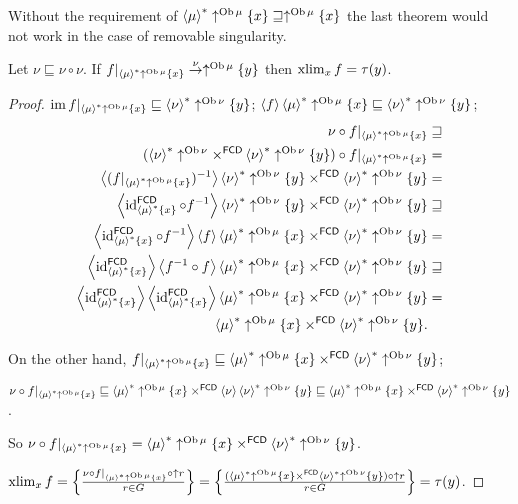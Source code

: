 \begin{rem}
Without the requirement of $\rsupfun{\mu}\uparrow^{\Ob\mu}\{x\}\sqsupseteq\uparrow^{\Ob\mu}\{x\}$
the last theorem would not work in the case of removable singularity.\end{rem}
\begin{thm}
Let $\nu\sqsubseteq\nu\circ\nu$. If $f|_{\rsupfun{\mu}\uparrow^{\Ob\mu}\{x\}}\overset{\nu}{\rightarrow}\uparrow^{\Ob\mu}\{y\}$
then $\xlim_{x}f=\tau(y)$.\end{thm}
\begin{proof}
$\im f|_{\rsupfun{\mu}\uparrow^{\Ob\mu}\{x\}}\sqsubseteq\rsupfun{\nu}\uparrow^{\Ob\nu}\{y\}$;
$\supfun f\rsupfun{\mu}\uparrow^{\Ob\mu}\{x\}\sqsubseteq\rsupfun{\nu}\uparrow^{\Ob\nu}\{y\}$;
\begin{align*}
\nu\circ f|_{\rsupfun{\mu}\uparrow^{\Ob\mu}\{x\}} & \sqsupseteq\\
(\rsupfun{\nu}\uparrow^{\Ob\nu}\times^{\mathsf{FCD}}\rsupfun{\nu}\uparrow^{\Ob\nu}\{y\})\circ f|_{\rsupfun{\mu}\uparrow^{\Ob\mu}\{x\}} & =\\
\supfun{(f|_{\rsupfun{\mu}\uparrow^{\Ob\mu}\{x\}})^{-1}}\rsupfun{\nu}\uparrow^{\Ob\nu}\{y\}\times^{\mathsf{FCD}}\rsupfun{\nu}\uparrow^{\Ob\nu}\{y\} & =\\
\supfun{\id_{\rsupfun{\mu}\{x\}}^{\mathsf{FCD}}\circ f^{-1}}\rsupfun{\nu}\uparrow^{\Ob\nu}\{y\}\times^{\mathsf{FCD}}\rsupfun{\nu}\uparrow^{\Ob\nu}\{y\} & \sqsupseteq\\
\supfun{\id_{\rsupfun{\mu}\{x\}}^{\mathsf{FCD}}\circ f^{-1}}\supfun f\rsupfun{\mu}\uparrow^{\Ob\mu}\{x\}\times^{\mathsf{FCD}}\rsupfun{\nu}\uparrow^{\Ob\nu}\{y\} & =\\
\supfun{\id_{\rsupfun{\mu}\{x\}}^{\mathsf{FCD}}}\supfun{f^{-1}\circ f}\rsupfun{\mu}\uparrow^{\Ob\mu}\{x\}\times^{\mathsf{FCD}}\rsupfun{\nu}\uparrow^{\Ob\nu}\{y\} & \sqsupseteq\\
\supfun{\id_{\rsupfun{\mu}\{x\}}^{\mathsf{FCD}}}\supfun{\id_{\rsupfun{\mu}\{x\}}^{\mathsf{FCD}}}\rsupfun{\mu}\uparrow^{\Ob\mu}\{x\}\times^{\mathsf{FCD}}\rsupfun{\nu}\uparrow^{\Ob\nu}\{y\} & =\\
\rsupfun{\mu}\uparrow^{\Ob\mu}\{x\}\times^{\mathsf{FCD}}\rsupfun{\nu}\uparrow^{\Ob\nu}\{y\}.
\end{align*}


On the other hand, $f|_{\rsupfun{\mu}\uparrow^{\Ob\mu}\{x\}}\sqsubseteq\rsupfun{\mu}\uparrow^{\Ob\mu}\{x\}\times^{\mathsf{FCD}}\rsupfun{\nu}\uparrow^{\Ob\nu}\{y\}$;

$\nu\circ f|_{\rsupfun{\mu}\uparrow^{\Ob\mu}\{x\}}\sqsubseteq\rsupfun{\mu}\uparrow^{\Ob\mu}\{x\}\times^{\mathsf{FCD}}\supfun{\nu}\rsupfun{\nu}\uparrow^{\Ob\nu}\{y\}\sqsubseteq\rsupfun{\mu}\uparrow^{\Ob\mu}\{x\}\times^{\mathsf{FCD}}\rsupfun{\nu}\uparrow^{\Ob\nu}\{y\}$.

So $\nu\circ f|_{\rsupfun{\mu}\uparrow^{\Ob\mu}\{x\}}=\rsupfun{\mu}\uparrow^{\Ob\mu}\{x\}\times^{\mathsf{FCD}}\rsupfun{\nu}\uparrow^{\Ob\nu}\{y\}$.

$\xlim_{x}f=\setcond{\nu\circ f|_{\rsupfun{\mu}\uparrow^{\Ob\mu}\{x\}}\circ\uparrow r}{r\in G}=\setcond{(\rsupfun{\mu}\uparrow^{\Ob\mu}\{x\}\times^{\mathsf{FCD}}\rsupfun{\nu}\uparrow^{\Ob\nu}\{y\})\circ\uparrow r}{r\in G}=\tau(y)$.\end{proof}
